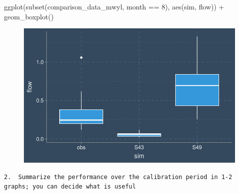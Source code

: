 \documentclass[
  letterpaper,
  DIV=11,
  numbers=noendperiod]{scrartcl}
\newenvironment{Shaded}{\begin{snugshade}}{\end{snugshade}}
\newcommand{\DecValTok}[1]{\textcolor[rgb]{0.68,0.00,0.00}{#1}}
\newcommand{\FunctionTok}[1]{\textcolor[rgb]{0.28,0.35,0.67}{#1}}
\newcommand{\NormalTok}[1]{\textcolor[rgb]{0.00,0.23,0.31}{#1}}
\newcommand{\SpecialCharTok}[1]{\textcolor[rgb]{0.37,0.37,0.37}{#1}}
\begin{document}
\begin{Shaded}
\begin{Highlighting}[]
\FunctionTok{ggplot}\NormalTok{(}\FunctionTok{subset}\NormalTok{(comparison\_data\_mwyl, month }\SpecialCharTok{==} \DecValTok{8}\NormalTok{), }\FunctionTok{aes}\NormalTok{(sim, flow)) }\SpecialCharTok{+} \FunctionTok{geom\_boxplot}\NormalTok{()}
\end{Highlighting}
\end{Shaded}

\begin{figure}[H]

{\centering \includegraphics{calibration-assignment_files/figure-pdf/unnamed-chunk-8-1.pdf}

}

\end{figure}

\begin{verbatim}
2.  Summarize the performance over the calibration period in 1-2 graphs; you can decide what is useful
\end{verbatim}
\end{document}
